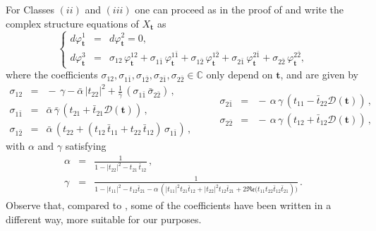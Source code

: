 \documentclass[a4paper]{amsart}
\theoremstyle{definition}
\theoremstyle{remark}
\numberwithin{equation}{section}
\begin{document}
For Classes $(ii)$ and $(iii)$ one can proceed as in the proof of \cite[Theorem 3.1]{angella-tomassini} and write the complex structure equations of $X_\mathbf{t}$ as
\begin{equation}\label{estructura-Iwasawa}
\left\{
\begin{array}{llll}
d\varphi_{\mathbf{t}}^1 \!\!&\!\!=\!\!&\!\! d\varphi_{\mathbf{t}}^2 = 0,\\[4pt]
d\varphi_{\mathbf{t}}^3 \!\!&\!\!=\!\!&\!\! \sigma_{12}\,\varphi_{\mathbf{t}}^{12}
+ \sigma_{1\bar{1}}\,\varphi_{\mathbf{t}}^{1\bar{1}} + \sigma_{1\bar{2}}\,\varphi_{\mathbf{t}}^{1\bar{2}}
+ \sigma_{2\bar{1}}\,\varphi_{\mathbf{t}}^{2\bar{1}} + \sigma_{2\bar{2}}\,\varphi_{\mathbf{t}}^{2\bar{2}},
\end{array}
\right.
\end{equation}
where the coefficients
$\sigma_{12},\sigma_{1\bar{1}},\sigma_{1\bar{2}},\sigma_{2\bar{1}},\sigma_{2\bar{2}} \in \mathbb{C}$ only depend on $\mathbf{t}$,
and are given by
\begin{equation}\label{coef-estructura-Iwasawa}
\begin{array}{rcl}
\sigma_{12} \!\!&\!\!=\!\!&\!\! - \,\gamma - \bar{\alpha}\,|t_{22}|^2 + \frac{1}{\bar{\gamma}}\,(\sigma_{1\bar{1}}\,\bar{\sigma}_{2\bar{2}})\,,\\[6pt]
\sigma_{1\bar{1}} \!\!&\!\!=\!\!&\!\! \bar{\alpha}\,\bar{\gamma}\,\left(t_{21}+\bar{t}_{21}\mathcal{D}(\mathbf{t})\right)\,,\\[6pt]
\sigma_{1\bar{2}} \!\!&\!\!=\!\!&\!\! \bar{\alpha}\,\left(t_{22}+(t_{12}\,\bar{t}_{11}+t_{22}\,\bar{t}_{12})\,\sigma_{1\bar{1}}\right)\,,
\end{array}\qquad
\begin{array}{rcl}
\sigma_{2\bar{1}} \!\!&\!\!=\!\!&\!\! - \,\alpha\,\gamma\,(t_{11}-\bar{t}_{22}\mathcal{D}(\mathbf{t}))\,,\\[6pt]
\sigma_{2\bar{2}} \!\!&\!\!=\!\!&\!\! - \,\alpha\,\gamma\,(t_{12}+\bar{t}_{12}\mathcal{D}(\mathbf{t}))\,,
\end{array}
\end{equation}
with $\alpha$ and $\gamma$ satisfying
$$
\begin{array}{rcl}
\alpha \!\!&\!\!=\!\!&\!\! \displaystyle\frac{1}{1-|t_{22}|^2-t_{21}\,\bar{t}_{12}}\,,\\[8pt]
\gamma \!\!&\!\!=\!\!&\!\! \displaystyle\frac{1}{1-|t_{11}|^2-t_{12}\bar{t}_{21}-\alpha\,
     \left(|t_{11}|^2t_{21}\bar{t}_{12}+|t_{22}|^2t_{12}\bar{t}_{21}+2\mathfrak{Re}(t_{11}t_{22}\bar{t}_{12}\bar{t}_{21}\right))}\,.
\end{array}
$$
\noindent Observe that, compared to \cite{angella-tomassini}, some of the coefficients have been written in a different way, more suitable for our purposes.
\end{document}
